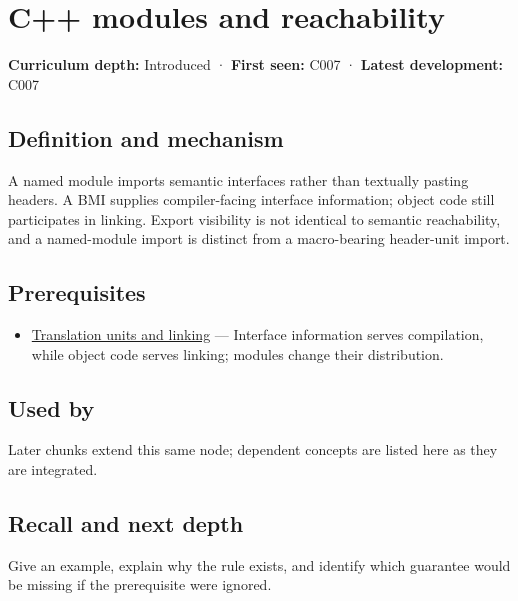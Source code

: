 \hypertarget{appendix-410a611a5b8d}{}
\section{C++ modules and reachability}\label{appendix-410a611a5b8d-c-modules-and-reachability}

\textbf{Curriculum depth:} Introduced · \textbf{First seen:} C007 · \textbf{Latest development:} C007

\subsection{Definition and mechanism}\label{appendix-410a611a5b8d-definition-and-mechanism}

A named module imports semantic interfaces rather than textually pasting headers. A BMI supplies compiler-facing interface information; object code still participates in linking. Export visibility is not identical to semantic reachability, and a named-module import is distinct from a macro-bearing header-unit import.

\subsection{Prerequisites}\label{appendix-410a611a5b8d-prerequisites}

\begin{itemize}
\tightlist
\item
  \hyperref[appendix-806686359e1b]{Translation units and linking} --- Interface information serves compilation, while object code serves linking; modules change their distribution.
\end{itemize}

\subsection{Used by}\label{appendix-410a611a5b8d-used-by}

Later chunks extend this same node; dependent concepts are listed here as they are integrated.

\subsection{Recall and next depth}\label{appendix-410a611a5b8d-recall-and-next-depth}

Give an example, explain why the rule exists, and identify which guarantee would be missing if the prerequisite were ignored.

